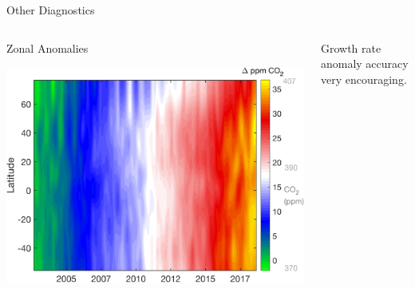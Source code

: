 \documentclass[10pt,t]{beamer}
\begin{document}
\begin{frame}[label={sec:orgf2793ca}]{Other \cd Diagnostics}
\vspace{-0.2in}

\begin{columns}
\begin{column}{0.5\columnwidth}
\begin{block}{\footnotesize Zonal Anomalies}
\vspace{-0.1in}
\begin{center}
\includegraphics[width=0.9\linewidth]{./Figs/Png/co2_anom_image_lat_vs_time.png}
\end{center}
\end{block}
\end{column}

\begin{column}{0.5\columnwidth}
\begin{block}{}
\footnotesize Growth rate anomaly accuracy very encouraging.
\end{block}
\end{column}
\end{columns}
\end{frame}
\end{document}

